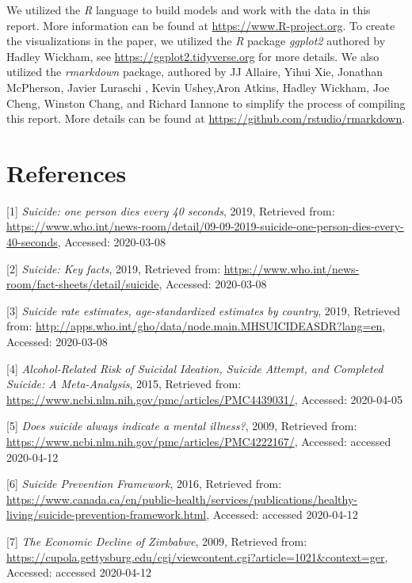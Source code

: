 \documentclass[]{article}
\begin{document}
We utilized the \emph{R} language to build models and work with the data
in this report. More information can be found at
\url{https://www.R-project.org}. To create the visualizations in the
paper, we utilized the \emph{R} package \emph{ggplot2} authored by
Hadley Wickham, see \url{https://ggplot2.tidyverse.org} for more
details. We also utilized the \emph{rmarkdown} package, authored by JJ
Allaire, Yihui Xie, Jonathan McPherson, Javier Luraschi , Kevin
Ushey,Aron Atkins, Hadley Wickham, Joe Cheng, Winston Chang, and Richard
Iannone to simplify the process of compiling this report. More details
can be found at \url{https://github.com/rstudio/rmarkdown}.

\newpage 

\section{References}\label{references}

{[}1{]} \emph{Suicide: one person dies every 40 seconds}, 2019,
Retrieved from:
\url{https://www.who.int/news-room/detail/09-09-2019-suicide-one-person-dies-every-40-seconds},
Accessed: 2020-03-08

{[}2{]} \emph{Suicide: Key facts}, 2019, Retrieved from:
\url{https://www.who.int/news-room/fact-sheets/detail/suicide},
Accessed: 2020-03-08

{[}3{]} \emph{Suicide rate estimates, age-standardized estimates by
country}, 2019, Retrieved from:
\url{http://apps.who.int/gho/data/node.main.MHSUICIDEASDR?lang=en},
Accessed: 2020-03-08

{[}4{]} \emph{Alcohol-Related Risk of Suicidal Ideation, Suicide
Attempt, and Completed Suicide: A Meta-Analysis}, 2015, Retrieved from:
\url{https://www.ncbi.nlm.nih.gov/pmc/articles/PMC4439031/}, Accessed:
2020-04-05

{[}5{]} \emph{Does suicide always indicate a mental illness?}, 2009,
Retrieved from:
\url{https://www.ncbi.nlm.nih.gov/pmc/articles/PMC4222167/}, Accessed:
accessed 2020-04-12

{[}6{]} \emph{Suicide Prevention Framework}, 2016, Retrieved from:
\url{https://www.canada.ca/en/public-health/services/publications/healthy-living/suicide-prevention-framework.html},
Accessed: accessed 2020-04-12

{[}7{]} \emph{The Economic Decline of Zimbabwe}, 2009, Retrieved from:
\url{https://cupola.gettysburg.edu/cgi/viewcontent.cgi?article=1021\&context=ger},
Accessed: accessed 2020-04-12
\end{document}
